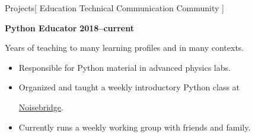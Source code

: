 \documentclass[11pt,a4paper]{article}
\newenvironment{worksection}[3]{
    \begin{addmargin}[0.5em]{0em}
    {\large\bfseries #1} \hfill {\bfseries #2}\\%
    \hspace*{1em}#3
    \begin{itemize}
        [label=-, topsep=0pt, itemsep=0.5ex, parsep=0pt, leftmargin=1em]
}{
    \end{itemize}
    \end{addmargin}
    \medskip
}
\newcommand{\Noisebridge}{
  \href{https://www.noisebridge.net/}{Noisebridge}.
}
\begin{document}
\begin{mysection}{Projects}[
    Education \textbullet{} Technical Communication \textbullet{} Community
]


  \begin{addmargin}[0.5em]{0em}
    {\large\bfseries Python Educator} \hfill {\bfseries 2018--current}%
    \begin{adjustwidth}{1ex}{0ex}

    Years of teaching to many learning profiles and in many contexts.
    \begin{itemize}
        [label=-, topsep=0pt, itemsep=0.5ex, parsep=0pt, leftmargin=1em]

      \item Responsible for Python material in advanced physics labs.
      \item Organized and taught a weekly introductory Python class at
            \Noisebridge
      \item Currently runs a weekly working group with friends and family.

    \end{itemize}
    \end{adjustwidth}
  \end{addmargin}
  \medskip


\end{mysection}
\end{document}
